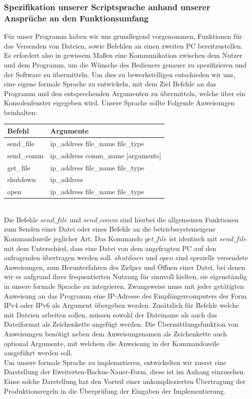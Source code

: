 \documentclass[12pt, a4paper]{scrartcl}
\begin{document}
\subsubsection{Spezifikation unserer Scriptsprache anhand unserer Ansprüche an den Funktionsumfang}
Für unser Programm haben wir uns grundlegend vorgenommen, Funktionen für das Versenden von Dateien, sowie Befehlen an einen zweiten PC bereitzustellen. Es erfordert also in gewissem Maßen eine Kommunikation zwischen dem Nutzer und dem Programm, um die Wünsche des Bedieners genauer zu spezifizieren und der Software zu übermitteln. Um dies zu bewerkstelligen entschieden wir uns, eine eigene formale Sprache zu entwickeln, mit dem Ziel Befehle an das Programm und den entsprechenden Argumenten zu übermitteln, welche über ein Konsolenfenster eigegeben wird.
Unsere Sprache sollte Folgende Anweisungen beinhalten:\\
\begin{table}[h!]
\centering
\begin{tabular}{|ll|}
\hline
Befehl & Argumente \\ \hline
send\_file & ip\_address file\_name file\_type \\
send\_comm & ip\_address comm\_name {[}arguments{]} \\
get\_file & ip\_address file\_name file\_type \\
shutdown & ip\_address \\
open & ip\_address file\_name file\_type \\ \hline
\end{tabular}
\end{table}\\
Die Befehle $send\_file$ und $send\_comm$ sind hierbei die allgemeinen Funktionen zum Senden einer Datei oder eines Befehls an die betriebssystemeigene Kommandozeile jeglicher Art. Das Kommando $get\_file$ ist identisch mit $send\_file$ mit dem Unterschied, dass eine Datei von dem angefragten PC auf den anfragenden übertragen werden soll.
$shutdown$ und $open$ sind spezielle versendete Anweisungen, zum Herunterfahren des Zielpcs und Öffnen einer Datei, bei denen wir es aufgrund ihrer frequentierten Nutzung für sinnvoll hielten, sie eigenständig in unsere formale Sprache zu integrieren. Zwangsweise muss mit jeder getätigten Anweisung an das Programm eine IP-Adresse des Empfängercomputers der Form IPv4 oder IPv6 als Argument übergeben werden. Zusätzlich für Befehle welche mit Dateien arbeiten sollen, müssen sowohl der Dateiname als auch das Dateiformat als Zeichenkette angefügt werden. Die Übermittlungsfunktion von Anweisungen benötigt neben dem Anweisungsnamen als Zeichenkette auch optional Argumente, mit welchem die Anweisung in der Kommandozeile ausgeführt werden soll.\\
Um unsere formale Sprache zu implemntieren, entwickelten wir zuerst eine Darstellung der Eweiterten-Backus-Nauer-Form, diese ist im Anhang einzusehen. Einse solche Darstellung hat den Vorteil einer unkompliezierten Übertragung der Produktionsregeln in die Überprüfung der Eingaben der Implementierung.
\end{document}
